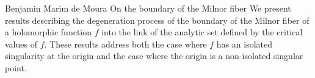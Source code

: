 \talk
{%
    Benjamin Marim de Moura
}
{%
    On the boundary of the Milnor fiber
}
{%
    We present results describing the degeneration process of the
    boundary of the Milnor fiber of a holomorphic function $f$ into
    the link of the analytic set defined by the critical values of
    $f$. These results address both the case where $f$ has an
    isolated singularity at the origin and the case where the origin
    is a non-isolated singular point.
}
